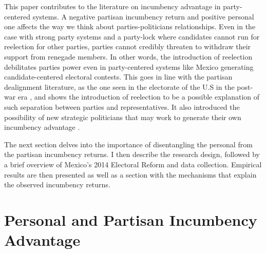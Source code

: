 This paper contributes to the literature on incumbency advantage in party-centered systems. A negative partisan incumbency return and positive personal one affects the way we think about parties-politicians relationships. Even in the case with strong party systems and a party-lock where candidates cannot run for reelection for other parties, parties cannot credibly threaten to withdraw their support from renegade members. In other words, the introduction of reelection debilitates parties power even in party-centered systems like Mexico generating candidate-centered electoral contests. This goes in line with the partisan dealignment literature, as the one seen in the electorate of the U.S in the post-war era  \citep{cox_katz_1996}, and shows the introduction of reelection to be a possible explanation of such separation between parties and representatives. It also introduced the possibility of new strategic politicians that may work to generate their own incumbency advantage  \citep{mayhew_1974, mckelvey_riezman_1992}.  
 
     

The next section delves into the importance of disentangling the personal from the partisan incumbency returns. I then describe the research design, followed by a brief overview of Mexico's 2014 Electoral Reform and data collection. Empirical results are then presented as well as a section with the mechanisms that explain the observed incumbency returns. %


\section{Personal and Partisan Incumbency Advantage \label{sec:personal_vs_partisan}}


